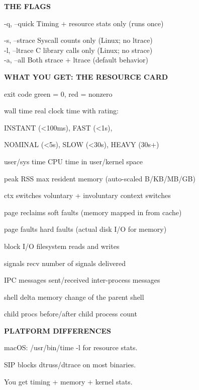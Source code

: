 \documentclass[11pt,a4paper,twoside]{book}
\begin{document}
\vspace{12pt}
{\bfseries\color{neonyellow} THE FLAGS}\vspace{4pt}

-q, --quick      Timing + resource stats only (runs once)

\begin{codebox}
-s, --strace     Syscall counts only (Linux; no ltrace)\\
-l, --ltrace     C library calls only (Linux; no strace)\\
-a, --all        Both strace + ltrace (default behavior)\\
\end{codebox}


\vspace{12pt}
{\bfseries\color{neonyellow} WHAT YOU GET: THE RESOURCE CARD}\vspace{4pt}

exit code          green = 0, red = nonzero

wall time          real clock time with rating:

INSTANT (<100ms), FAST (<1s),

NOMINAL (<5s), SLOW (<30s), HEAVY (30s+)

user/sys time      CPU time in user/kernel space

peak RSS           max resident memory (auto-scaled B/KB/MB/GB)

ctx switches       voluntary + involuntary context switches

page reclaims      soft faults (memory mapped in from cache)

page faults        hard faults (actual disk I/O for memory)

block I/O          filesystem reads and writes

signals recv       number of signals delivered

IPC messages       sent/received inter-process messages

shell delta        memory change of the parent shell

child procs        before/after child process count


\vspace{12pt}
{\bfseries\color{neonyellow} PLATFORM DIFFERENCES}\vspace{4pt}

macOS:  /usr/bin/time -l for resource stats.

SIP blocks dtruss/dtrace on most binaries.

You get timing + memory + kernel stats.
\end{document}
